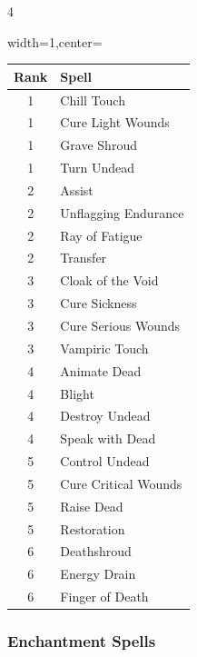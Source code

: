 \documentclass{book}
\begin{document}
\begin{multicols}{4}
\begin{table}[H]
	\begin{adjustbox}{width=1\columnwidth,center=\columnwidth}
		\begin{tabular}{cl}
			\toprule
			Rank & Spell \\
			\midrule
			1 & Chill Touch \\
			1 & Cure Light Wounds \\
			1 & Grave Shroud \\
			1 & Turn Undead \\
			2 & Assist \\
			2 & Unflagging Endurance \\
			2 & Ray of Fatigue \\
			2 & Transfer \\
			3 & Cloak of the Void \\
			3 & Cure Sickness \\
			3 & Cure Serious Wounds \\
			3 & Vampiric Touch \\
			4 & Animate Dead \\
			4 & Blight \\
			4 & Destroy Undead \\
			4 & Speak with Dead \\
			5 & Control Undead \\
			5 & Cure Critical Wounds \\
			5 & Raise Dead \\
			5 & Restoration \\
			6 & Deathshroud \\
			6 & Energy Drain \\
			6 & Finger of Death \\
			\bottomrule
		\end{tabular}
	\end{adjustbox}
\end{table}

\columnbreak

\subsubsection*{Enchantment Spells}\label{enchantment-spells}
	

\end{multicols}
\end{document}
